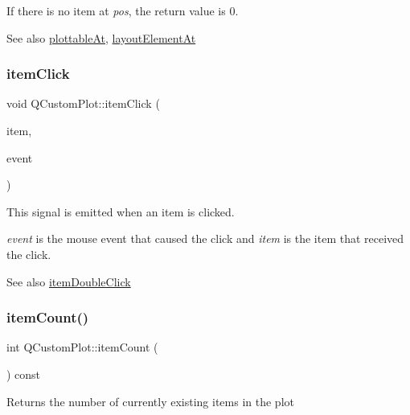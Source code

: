 If there is no item at {\itshape pos}, the return value is 0.

\begin{DoxySeeAlso}{See also}
\hyperlink{classQCustomPlot_acddbbd8b16dd633f0d94e5a736fbd8cf}{plottable\+At}, \hyperlink{classQCustomPlot_afaa1d304e0287d140fd238e90889ef3c}{layout\+Element\+At} 
\end{DoxySeeAlso}
\mbox{\label{classQCustomPlot_ae16b51f52d2b7aebbc7e3e74e6ff2e4b}} 
\subsubsection{\texorpdfstring{item\+Click}{itemClick}}
{\footnotesize\ttfamily void Q\+Custom\+Plot\+::item\+Click (\begin{DoxyParamCaption}\item[{\hyperlink{classQCPAbstractItem}{Q\+C\+P\+Abstract\+Item} $\ast$}]{item,  }\item[{Q\+Mouse\+Event $\ast$}]{event }\end{DoxyParamCaption})\hspace{0.3cm}{\ttfamily [signal]}}

This signal is emitted when an item is clicked.

{\itshape event} is the mouse event that caused the click and {\itshape item} is the item that received the click.

\begin{DoxySeeAlso}{See also}
\hyperlink{classQCustomPlot_ac83aa9f5a3e9bb3efc9cdc763dcd42a6}{item\+Double\+Click} 
\end{DoxySeeAlso}
\mbox{\label{classQCustomPlot_a16025daf0341f9362be3080e404424c2}} 
\subsubsection{\texorpdfstring{item\+Count()}{itemCount()}}
{\footnotesize\ttfamily int Q\+Custom\+Plot\+::item\+Count (\begin{DoxyParamCaption}{ }\end{DoxyParamCaption}) const}

Returns the number of currently existing items in the plot

